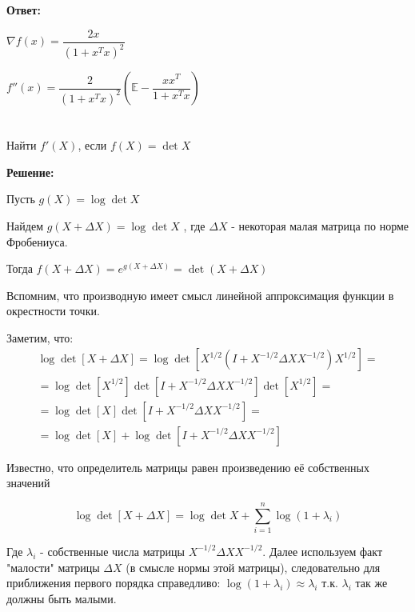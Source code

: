 \documentclass[a4paper,12pt]{article}
\newcommand{\lt}{\left}
\newcommand{\rt}{\right}
\newcommand{\D}{\Delta}
\begin{document}
\textbf{Ответ:}

$\nabla f(x) =  \dfrac{2{x}}{\lt(1 + {x}^T { x} \rt)^2}$

$f''(x) =  \dfrac{2}{\lt(1 + x^Tx\rt)^2}\lt(\mathbb{E} - \dfrac{xx^T}{1 + x^Tx} \rt)$


\section{}

Найти $f'(X)$, если $f(X) = \det X$

\vspace{\baselineskip}

\textbf{Решение:}

\vspace{\baselineskip}

Пусть $g(X) = \log\det X$

Найдем $g(X + \Delta X) = \log\det X$ , где $\Delta X$ - некоторая малая матрица по норме Фробениуса.

Тогда $f(X + \Delta X) = e^{g(X + \Delta X)} = \det (X + \D X)$

\vspace{\baselineskip}

Вспомним, что производную имеет смысл линейной аппроксимация функции в окрестности точки.

Заметим, что:
 \begin{multline}
 \log\det\left[ X+ \Delta X\right] = \log \det \left[ X^{1/2} \left(I + X^{-1/2} \Delta X X^{-1/2}\right)X^{1/2}\right] =\\= \log \det \left[ X^{1/2} \right]\det \left[ I + X^{-1/2} \Delta X X^{-1/2}\right] \det \left[ X^{1/2}\right] =\\= \log \det \left[ X \right]\det \left[ I + X^{-1/2} \Delta X X^{-1/2}\right]=\\= \log \det \left[ X \right] + \log\det \left[ I + X^{-1/2} \Delta X X^{-1/2}\right]
 \end{multline}
 
Известно, что определитель матрицы равен произведению её собственных значений
 
 $$\log\det\left[ X+ \Delta X\right] = \log\det X + \sum\limits_{i=1}^n \log(1 + \lambda_i)$$
 
Где $\lambda_i$ - собственные числа матрицы $X^{-1/2} \Delta X X^{-1/2}$. Далее используем факт "малости" матрицы $\Delta X$ (в смысле нормы этой матрицы), следовательно для приближения первого порядка справедливо: $\log (1 + \lambda_i) \approx \lambda_i$ т.к. $\lambda_i$ так же должны быть малыми.
 
\end{document}
